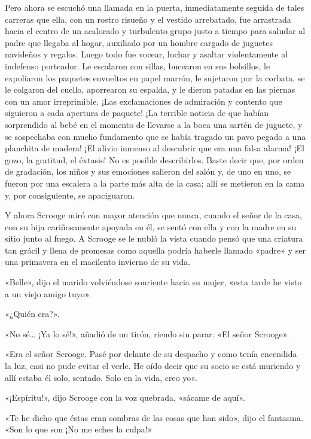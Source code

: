 \documentclass{novela}
\begin{document}
 Pero ahora se escuchó una llamada en la puerta, inmediatamente seguida de tales carreras que ella, con un rostro risueño y el vestido arrebatado, fue arrastrada hacia el centro de un acalorado y turbulento grupo justo a tiempo para saludar al padre que llegaba al hogar, auxiliado por un hombre cargado de juguetes navideños y regalos. Luego todo fue vocear, luchar y asaltar violentamente al indefenso porteador. Le escalaron con sillas, bucearon en sus bolsillos, le expoliaron los paquetes envueltos en papel marrón, le sujetaron por la corbata, se le colgaron del cuello, aporrearon su espalda, y le dieron patadas en las piernas con un amor irreprimible. ¡Las exclamaciones de admiración y contento que siguieron a cada apertura de paquete! ¡La terrible noticia de que habían sorprendido al bebé en el momento de llevarse a la boca una sartén de juguete, y se sospechaba con mucho fundamento que se había tragado un pavo pegado a una planchita de madera! ¡El alivio inmenso al descubrir que era una falsa alarma! ¡El gozo, la gratitud, el éxtasis! No es posible describirlos. Baste decir que, por orden de gradación, los niños y sus emociones salieron del salón y, de uno en uno, se fueron por una escalera a la parte más alta de la casa; allí se metieron en la cama y, por consiguiente, se apaciguaron.

 Y ahora Scrooge miró con mayor atención que nunca, cuando el señor de la casa, con su hija cariñosamente apoyada en él, se sentó con ella y con la madre en su sitio junto al fuego. A Scrooge se le nubló la vista cuando pensó que una criatura tan grácil y llena de promesas como aquella podría haberle llamado «padre» y ser una primavera en el macilento invierno de su vida.

 «Belle», dijo el marido volviéndose sonriente hacia su mujer, «esta tarde he visto a un viejo amigo tuyo».

 «¿Quién era?».

 «No sé{\ldots} ¡Ya lo sé!», añadió de un tirón, riendo sin parar. «El señor Scrooge».

 «Era el señor Scrooge. Pasé por delante de su despacho y como tenía encendida la luz, casi no pude evitar el verle. He oído decir que su socio se está muriendo y allí estaba él solo, sentado. Solo en la vida, creo yo».

 «¡Espíritu!», dijo Scrooge con la voz quebrada, «sácame de aquí».

 «Te he dicho que éstas eran sombras de las cosas que han sido», dijo el fantasma. «Son lo que son ¡No me eches la culpa!»
\end{document}
